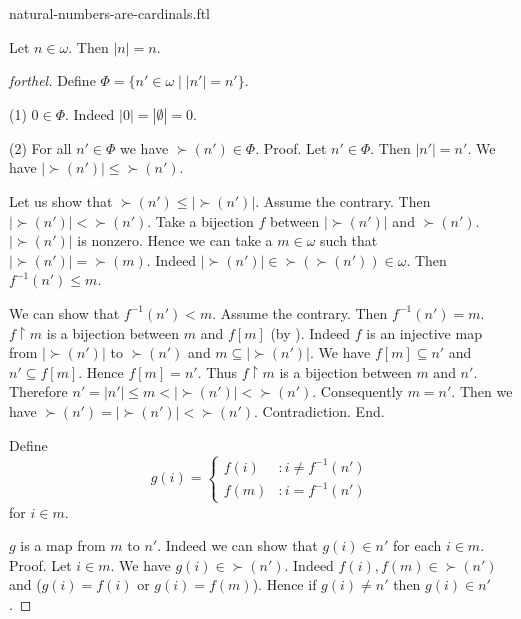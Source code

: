 \documentclass{naproche-library}
\begin{document}
\begin{smodule}[title=Natural Numbers are Cardinal Numbers]{natural-numbers-are-cardinals.ftl}

\begin{theorem}[forthel,id=SET_THEORY_07_2948332552978432]
  Let $n \in \omega$.
  Then $|n| = n$.
\end{theorem}
\begin{proof}[forthel]
  Define $\Phi = \{ n' \in \omega \mid |n'| = n' \}$.

  (1) $0 \in \Phi$.
  Indeed $|0| = |\emptyset| = 0$.

  (2) For all $n' \in \Phi$ we have $\succ(n') \in \Phi$. \newline
  Proof.
    Let $n' \in \Phi$.
    Then $|n'| = n'$.
    We have $|\succ(n')| \leq \succ(n')$.

    Let us show that $\succ(n') \leq |\succ(n')|$.
      Assume the contrary.
      Then $|\succ(n')| < \succ(n')$.
      Take a bijection $f$ between $|\succ(n')|$ and $\succ(n')$.
      $|\succ(n')|$ is nonzero.
      Hence we can take a $m \in \omega$ such that $|\succ(n')| = \succ(m)$.
      Indeed $|\succ(n')| \in \succ(\succ(n')) \in \omega$.
      Then $f^{-1}(n') \leq m$.

      We can show that $f^{-1}(n') < m$.
        Assume the contrary.
        Then $f^{-1}(n') = m$.
        $f \restriction m$ is a bijection between $m$ and $f[m]$ (by ).
        Indeed $f$ is an injective map from $|\succ(n')|$ to $\succ(n')$ and
        $m \subseteq |\succ(n')|$.
        We have $f[m] \subseteq n'$ and $n' \subseteq f[m]$.
        Hence $f[m] = n'$.
        Thus $f \restriction m$ is a bijection between $m$ and $n'$.
        Therefore $n'
          = |n'|
          \leq m
          < |\succ(n')|
          < \succ(n')$.
        Consequently $m = n'$.
        Then we have $\succ(n') = |\succ(n')| < \succ(n')$.
        Contradiction.
      End.

      Define \[ g(i) =
        \begin{cases}
          f(i)  & : i \neq f^{-1}(n')
          \\
          f(m)  & : i = f^{-1}(n')
        \end{cases} \]
      for $i \in m$.

      $g$ is a map from $m$ to $n'$.
      Indeed we can show that $g(i) \in n'$ for each $i \in m$. \newline
      Proof.
        Let $i \in m$.
        We have $g(i) \in \succ(n')$.
        Indeed $f(i), f(m) \in \succ(n')$ and ($g(i) = f(i)$ or $g(i) = f(m)$).
        Hence if $g(i) \neq n'$ then $g(i) \in n'$.


\end{proof}
\end{smodule}
\end{document}
